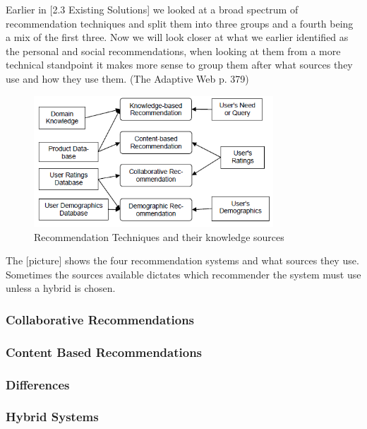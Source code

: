 Earlier in [2.3 Existing Solutions] we looked at a broad spectrum of recommendation techniques and  split them into three groups and a fourth being a mix of the first three. Now we will look closer at what we earlier identified as the personal and social recommendations, when looking at them from a more technical standpoint it makes more sense to group them after what sources they use and how they use them. (The Adaptive Web p. 379)

\begin{figure}[H]
\centering
\includegraphics[width=0.8\textwidth]{Images/RecTypes.png}
\caption{Recommendation Techniques and their knowledge sources}
\label{RecTypes}
\end{figure}

The [picture] shows the four recommendation systems and what sources they use. Sometimes the sources available dictates which recommender the system must use unless a hybrid is chosen. 


\subsubsection{Collaborative Recommendations} 
\label{Collaborative} 

\subsubsection{Content Based Recommendations} 
\label{ContentBased} 

\subsubsection{Differences}
\label{Differences} 

\subsubsection{Hybrid Systems} 
\label{Hybrid} 
